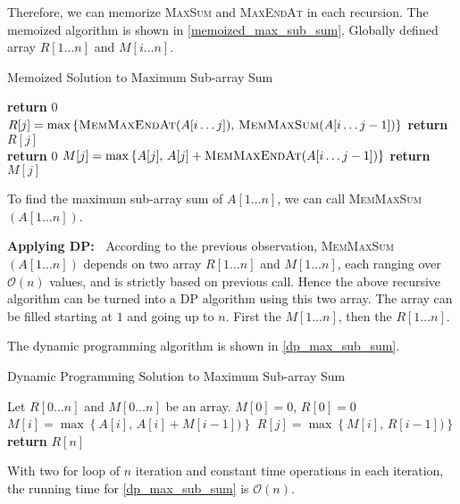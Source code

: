 \begin{homeworkProblem}
Therefore, we can memorize \textsc{MaxSum} and \textsc{MaxEndAt} in each recursion.
The memoized algorithm is shown in \cref{memoized_max_sub_sum}.
Globally defined array $R[1 \ldots n]$ and $M[i \ldots n]$.

\begin{algorithm}[H]
    \caption{Memoized Solution to Maximum Sub-array Sum}\label{memoized_max_sub_sum}
    \begin{algorithmic}[1]
                \State \textbf{return } $0$
            \EndIf
            \State $R[j] = \max\left\{\text{\textsc{MemMaxEndAt}}(A[i\ldots j])\text{,\ }\text{\textsc{MemMaxSum}}(A[i\ldots j-1])\right\}$
            \EndIf
            \State \textbf{return } $R[j]$
        \EndProcedure
        \\\hrulefill
                \State \textbf{return } $0$
            \EndIf
            \State $M[j] = \max\left\{A[j]\text{,\ }A[j] + \text{\textsc{MemMaxEndAt}}(A[i\ldots j-1])\right\}$
            \EndIf
            \State \textbf{return } $M[j]$
        \EndProcedure
    \end{algorithmic}
\end{algorithm}

To find the maximum sub-array sum of $A[1\ldots n]$, we can call \textsc{MemMaxSum}$(A[1\ldots n])$.

\textbf{Applying DP:\ }
According to the previous observation, \textsc{MemMaxSum}$(A[1\ldots n])$ depends on two array 
$R[1\ldots n]$ and $M[1\ldots n]$, each ranging over $\mathcal{O}(n)$ values, and is strictly
based on previous call. Hence the above recursive algorithm can be turned into a DP
algorithm using this two array. The array can be filled starting at $1$ and going up to $n$.
First the $M[1\ldots n]$, then the $R[1\dots n]$.

The dynamic programming algorithm is shown in \cref{dp_max_sub_sum}.

\begin{algorithm}[H]
    \caption{Dynamic Programming Solution to Maximum Sub-array Sum}\label{dp_max_sub_sum}
    \begin{algorithmic}[1]
            \State Let $R[0\ldots n]$ and $M[0\ldots n]$ be an array.
            \State $M[0] = 0$, $R[0] = 0$
                \State $M[i] = \max\left\{A[i]\text{,\ }A[i] + M[i-1])\right\}$
            \EndFor
                \State $R[j] = \max\left\{M[i]\text{,\ }R[i-1])\right\}$
            \EndFor
            \State \textbf{return }$R[n]$
        \EndProcedure
    \end{algorithmic}
\end{algorithm}

With two for loop of $n$ iteration and constant time operations in each iteration, the running time for \cref{dp_max_sub_sum} is $\mathcal{O}(n)$.

\end{homeworkProblem}
